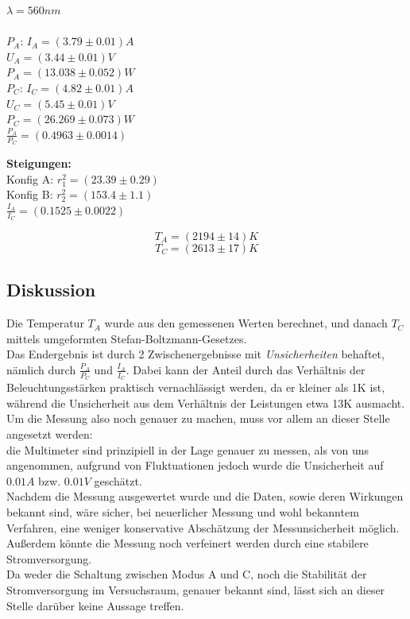 \documentclass[12pt,a4paper]{article}
\begin{document}
\begin{multicols}{2}


\noindent $\lambda = 560 nm$\\
\\

\noindent$P_A$: $I_A=(3.79\pm 0.01)A$\\
\indent $U_A=(3.44\pm 0.01)V$\\
$P_A=(13.038 \pm 0.052)W$\\

\noindent $P_C$: $I_C=(4.82\pm0.01)A$\\
\indent $U_C=(5.45 \pm 0.01)V$\\
$P_C=(26.269 \pm 0.073)W$\\

\noindent $\frac{P_A}{P_C}=(0.4963 \pm 0.0014)$\\



\pagebreak

\noindent \textbf{Steigungen:}\\
Konfig A: $r_1^2=(23.39 \pm 0.29)$\\
Konfig B: $r_2^2=(153.4 \pm 1.1)$\\

$\frac{I_A}{I_C}= ( 0.1525 \pm 0.0022)$

$$T_A= (2194\pm 14)K$$
$$T_C=(2613 \pm 17)K$$

\subsection{Diskussion}

Die Temperatur $T_A$ wurde aus den gemessenen Werten berechnet, und danach $T_C$ mittels umgeformten Stefan-Boltzmann-Gesetzes.\\
Das Endergebnis ist durch 2 Zwischenergebnisse mit \emph{Unsicherheiten} behaftet, nämlich durch $\frac{P_A}{P_C}$ und $\frac{I_A}{I_C}$. Dabei kann der Anteil durch das Verhältnis der Beleuchtungsstärken praktisch vernachlässigt werden, da er kleiner als 1K ist, während die Unsicherheit aus dem Verhältnis der Leistungen etwa 13K ausmacht.\\

Um die Messung also noch genauer zu machen, muss vor allem an dieser Stelle angesetzt werden:\\
die Multimeter sind prinzipiell in der Lage genauer zu messen, als von uns angenommen, aufgrund von Fluktuationen jedoch wurde die Unsicherheit auf $0.01A$ bzw. $0.01V$ geschätzt.\\
Nachdem die Messung ausgewertet wurde und die Daten, sowie deren Wirkungen bekannt sind, wäre sicher, bei neuerlicher Messung und wohl bekanntem Verfahren, eine weniger konservative Abschätzung der Messunsicherheit möglich.\\
Außerdem könnte die Messung noch verfeinert werden durch eine stabilere Stromversorgung.\\
Da weder die Schaltung zwischen Modus A und C, noch die Stabilität der Stromversorgung im Versuchsraum, genauer bekannt sind, lässt sich an dieser Stelle darüber keine Aussage treffen.\\


\end{multicols}
\end{document}
